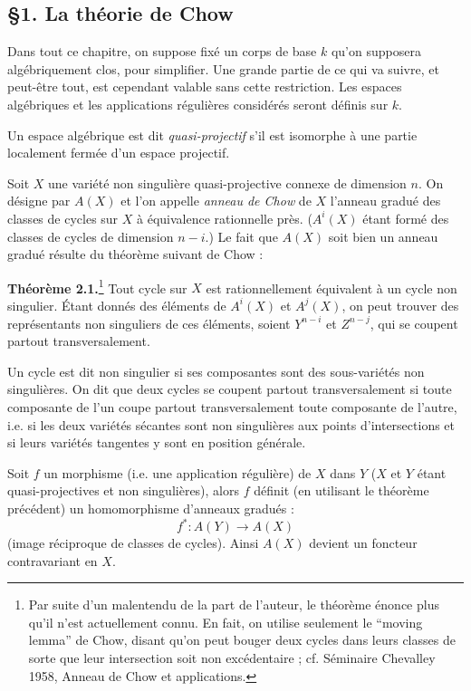 \documentclass[11pt]{article}
\begin{document}
\subsection*{\S 1. La théorie de Chow}

Dans tout ce chapitre, on suppose fixé un corps de base $k$ qu'on supposera algébriquement clos, pour simplifier. Une grande partie de ce qui va suivre, et peut-être tout, est cependant valable sans cette restriction. Les espaces algébriques et les applications régulières considérés seront définis sur $k$.

Un espace algébrique est dit \emph{quasi-projectif} s'il est isomorphe à une partie localement fermée d'un espace projectif.

Soit $X$ une variété non singulière quasi-projective connexe de dimension $n$. On désigne par $A(X)$ et l'on appelle \emph{anneau de Chow} de $X$ l'anneau gradué des classes de cycles sur $X$ à équivalence rationnelle près. ($A^i(X)$ étant formé des classes de cycles de dimension $n-i$.) Le fait que $A(X)$ soit bien un anneau gradué résulte du théorème suivant de Chow :

\textbf{Théorème 2.1.}\footnote{Par suite d'un malentendu de la part de l'auteur, le théorème énonce plus qu'il n'est actuellement connu. En fait, on utilise seulement le ``moving lemma'' de Chow, disant qu'on peut bouger deux cycles dans leurs classes de sorte que leur intersection soit non excédentaire ; cf. Séminaire Chevalley 1958, Anneau de Chow et applications.} Tout cycle sur $X$ est rationnellement équivalent à un cycle non singulier. Étant donnés des éléments de $A^i(X)$ et $A^j(X)$, on peut trouver des représentants non singuliers de ces éléments, soient $Y^{n-i}$ et $Z^{n-j}$, qui se coupent partout transversalement.

Un cycle est dit non singulier si ses composantes sont des sous-variétés non singulières. On dit que deux cycles se coupent partout transversalement si toute composante de l'un coupe partout transversalement toute composante de l'autre, i.e. si les deux variétés sécantes sont non singulières aux points d'intersections et si leurs variétés tangentes y sont en position générale.

Soit $f$ un morphisme (i.e. une application régulière) de $X$ dans $Y$ ($X$ et $Y$ étant quasi-projectives et non singulières), alors $f$ définit (en utilisant le théorème précédent) un homomorphisme d'anneaux gradués :
\begin{equation}\tag{2.1}
f^*:A(Y)\longrightarrow A(X)
\end{equation}
(image réciproque de classes de cycles). Ainsi $A(X)$ devient un foncteur contravariant en $X$.
\end{document}
